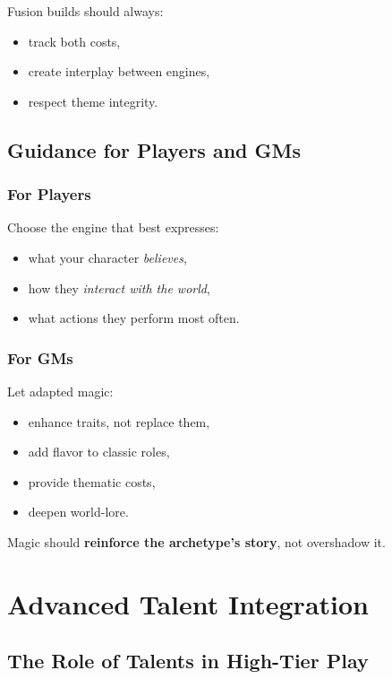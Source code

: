 \documentclass[11pt]{book}
\begin{document}
Fusion builds should always:
\begin{itemize}
  \item track both costs,
  \item create interplay between engines,
  \item respect theme integrity.
\end{itemize}

\section{Guidance for Players and GMs}
\subsection{For Players}
Choose the engine that best expresses:
\begin{itemize}
  \item what your character \emph{believes},
  \item how they \emph{interact with the world},
  \item what actions they perform most often.
\end{itemize}

\subsection{For GMs}
Let adapted magic:
\begin{itemize}
  \item enhance traits, not replace them,
  \item add flavor to classic roles,
  \item provide thematic costs,
  \item deepen world-lore.
\end{itemize}

Magic should \textbf{reinforce the archetype's story}, not overshadow it.

\chapter{Advanced Talent Integration}

\section{The Role of Talents in High-Tier Play}
\end{document}
